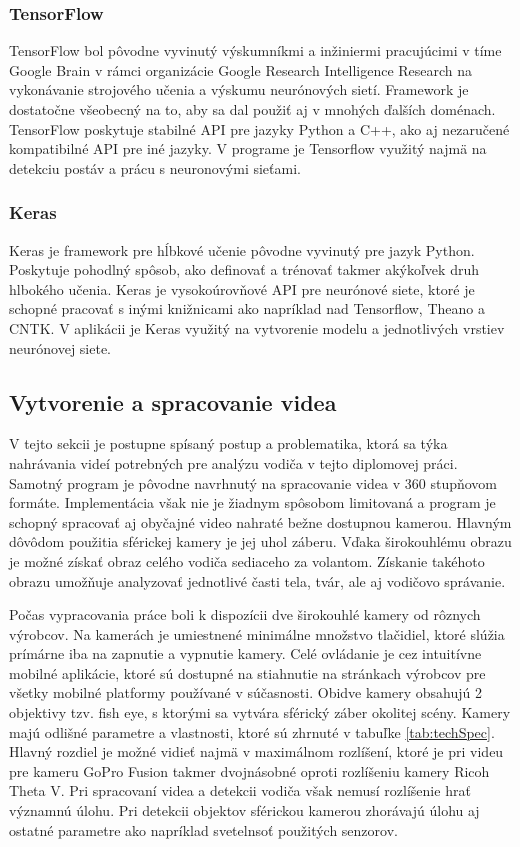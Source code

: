 \documentclass[slovak,master,dept460,male,cpp,cpdeclaration]{diploma}
\begin{document}
\subsubsection*{TensorFlow}
TensorFlow\cite{tensorflow2015-whitepaper} bol pôvodne vyvinutý výskumníkmi a inžiniermi pracujúcimi v tíme Google Brain v rámci organizácie Google Research Intelligence Research na vykonávanie strojového učenia a výskumu neurónových sietí. Framework je dostatočne všeobecný na to, aby sa dal použiť aj v mnohých ďalších doménach. TensorFlow poskytuje stabilné API  pre jazyky Python a C++, ako aj nezaručené kompatibilné API pre iné jazyky. V programe je Tensorflow využitý najmä na detekciu postáv a prácu s neuronovými sieťami.



\subsubsection*{Keras}
Keras\cite{chollet2015keras} je framework pre hĺbkové učenie pôvodne vyvinutý pre jazyk Python. Poskytuje pohodlný spôsob, ako definovať a trénovať takmer akýkoľvek druh hlbokého učenia. Keras je vysokoúrovňové API pre neurónové siete, ktoré je schopné pracovať s inými knižnicami ako napríklad nad Tensorflow, Theano\cite{theano} a CNTK. V aplikácii je Keras využitý na vytvorenie modelu a jednotlivých vrstiev neurónovej siete.



\subsection{Vytvorenie a spracovanie videa}
V tejto sekcii je postupne spísaný postup a problematika, ktorá sa týka nahrávania videí potrebných pre analýzu vodiča v tejto diplomovej práci. Samotný program je pôvodne navrhnutý na spracovanie videa v 360 stupňovom formáte. Implementácia však nie je žiadnym spôsobom limitovaná a program je schopný spracovať aj obyčajné video nahraté bežne dostupnou kamerou. Hlavným dôvôdom použitia  sférickej kamery je jej uhol záberu. Vďaka širokouhlému obrazu je možné získať obraz celého vodiča sediaceho za volantom. Získanie takéhoto obrazu umožňuje analyzovať jednotlivé časti tela, tvár, ale aj vodičovo správanie.\par
 Počas vypracovania práce boli k dispozícii dve širokouhlé kamery od rôznych výrobcov. Na kamerách je umiestnené minimálne množstvo tlačidiel, ktoré slúžia prímárne iba na zapnutie a vypnutie kamery. Celé ovládanie je cez intuitívne mobilné aplikácie, ktoré sú dostupné na stiahnutie na stránkach výrobcov pre všetky mobilné platformy používané v súčasnosti. Obidve kamery obsahujú 2 objektivy tzv. fish eye, s ktorými sa vytvára sférický záber okolitej scény. Kamery majú odlišné parametre a vlastnosti, ktoré sú zhrnuté v tabuľke \ref{tab:techSpec}. Hlavný rozdiel je možné vidieť najmä v maximálnom rozlíšení, ktoré je pri videu pre kameru GoPro Fusion takmer dvojnásobné oproti rozlíšeniu kamery Ricoh Theta V. Pri spracovaní videa a detekcii vodiča však nemusí rozlíšenie hrať významnú úlohu. Pri detekcii objektov sférickou kamerou zhorávajú úlohu aj ostatné parametre ako napríklad svetelnsoť použitých senzorov.
\end{document}
